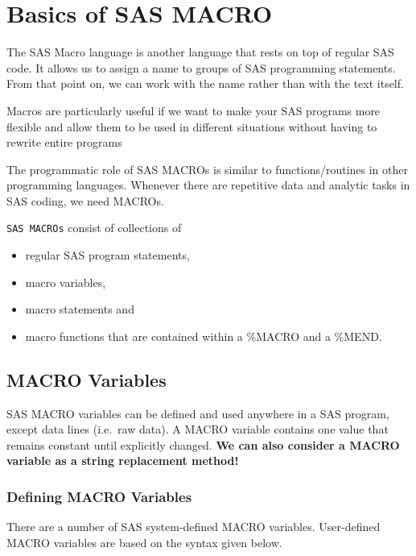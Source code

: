 \documentclass[
]{book}
\providecommand{\tightlist}{%
  \setlength{\itemsep}{0pt}\setlength{\parskip}{0pt}}
\begin{document}
\hypertarget{basics-of-sas-macro}{%
\chapter{Basics of SAS MACRO}\label{basics-of-sas-macro}}

The SAS Macro language is another language that rests on top of regular SAS code. It allows us to assign a name to groups of SAS programming statements. From that point on, we can work with the name rather than with the text itself.

Macros are particularly useful if we want to make your SAS programs more flexible and allow them to be used in different situations without having to rewrite entire programs

The programmatic role of SAS MACROs is similar to functions/routines in other programming languages. Whenever there are repetitive data and analytic tasks in SAS coding, we need MACROs.

\texttt{SAS\ MACROs} consist of collections of

\begin{itemize}
\tightlist
\item
  regular SAS program statements,
\item
  macro variables,
\item
  macro statements and
\item
  macro functions that are contained within a \%MACRO and a \%MEND.
\end{itemize}

\hypertarget{macro-variables}{%
\section{MACRO Variables}\label{macro-variables}}

SAS MACRO variables can be defined and used anywhere in a SAS program, except data lines (i.e.~raw data). A MACRO variable contains one value that remains constant until explicitly changed. \textbf{We can also consider a MACRO variable as a string replacement method!}

\hypertarget{defining-macro-variables}{%
\subsection{Defining MACRO Variables}\label{defining-macro-variables}}

There are a number of SAS system-defined MACRO variables. User-defined MACRO variables are based on the syntax given below.
\end{document}
